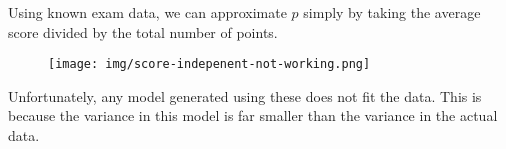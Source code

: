 \documentclass{article}
\begin{document}
            Using known exam data, we can approximate $p$ simply by taking the average score divided
                by the total number of points.

            \begin{figure}[h!]
                \centering
                \texttt{[image: img/score-indepenent-not-working.png]}
            \end{figure}


            Unfortunately, any model generated using these does not fit the data. This is because
                the variance in this model is far smaller than the variance in the actual data.
\end{document}
